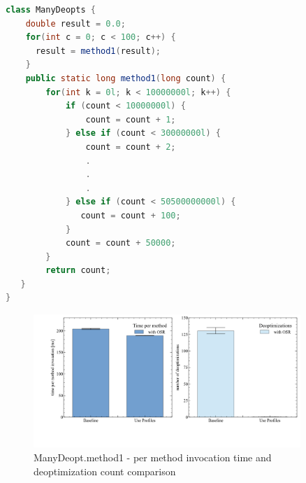 \lstset{numbers=left, numberstyle=\tiny, stepnumber=1, numbersep=5pt}
\lstset{basicstyle=\ttfamily}
\lstset{frame=tb}
\begin{lstlisting}[float,caption=Example usage of the listing package,label=l:manydeopts,language=Java]
class ManyDeopts {
    double result = 0.0;
    for(int c = 0; c < 100; c++) {
      result = method1(result);
    }
    public static long method1(long count) {
        for(int k = 0l; k < 10000000l; k++) {
            if (count < 10000000l) {
                count = count + 1;
            } else if (count < 30000000l) {
                count = count + 2;
                .
                .
                .
            } else if (count < 50500000000l) {
               count = count + 100;
            }
            count = count + 50000;
        }
        return count;
   }
}
\end{lstlisting}
\begin{figure}[h]
  \begin{center}
    \centering
    \includegraphics[width=0.9\textwidth]{figures/manydeopt.png}
    \caption{ManyDeopt.method1 - per method invocation time and deoptimization count comparison}
    \label{f:manydeopt}
  \end{center}
\end{figure}

